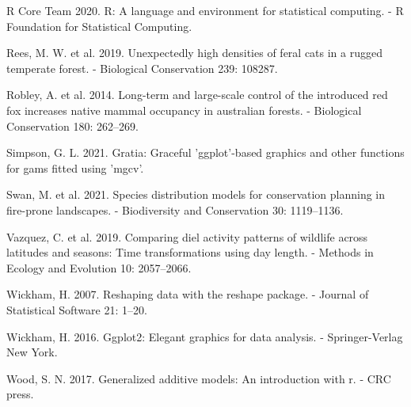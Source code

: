 \documentclass[]{elsarticle} %
\begin{document}
\leavevmode\hypertarget{ref-R}{}%
R Core Team 2020. R: A language and environment for statistical computing. - R Foundation for Statistical Computing.

\leavevmode\hypertarget{ref-REES2019108287}{}%
Rees, M. W. et al. 2019. Unexpectedly high densities of feral cats in a rugged temperate forest. - Biological Conservation 239: 108287.

\leavevmode\hypertarget{ref-ROBLEY2014262}{}%
Robley, A. et al. 2014. Long-term and large-scale control of the introduced red fox increases native mammal occupancy in australian forests. - Biological Conservation 180: 262--269.

\leavevmode\hypertarget{ref-gratia}{}%
Simpson, G. L. 2021. Gratia: Graceful 'ggplot'-based graphics and other functions for gams fitted using 'mgcv'.

\leavevmode\hypertarget{ref-swan2021species}{}%
Swan, M. et al. 2021. Species distribution models for conservation planning in fire-prone landscapes. - Biodiversity and Conservation 30: 1119--1136.

\leavevmode\hypertarget{ref-https:ux2fux2fdoi.orgux2f10.1111ux2f2041-210X.13290}{}%
Vazquez, C. et al. 2019. Comparing diel activity patterns of wildlife across latitudes and seasons: Time transformations using day length. - Methods in Ecology and Evolution 10: 2057--2066.

\leavevmode\hypertarget{ref-reshape}{}%
Wickham, H. 2007. Reshaping data with the reshape package. - Journal of Statistical Software 21: 1--20.

\leavevmode\hypertarget{ref-ggplot2}{}%
Wickham, H. 2016. Ggplot2: Elegant graphics for data analysis. - Springer-Verlag New York.

\leavevmode\hypertarget{ref-wood2017}{}%
Wood, S. N. 2017. Generalized additive models: An introduction with r. - CRC press.
\end{document}
